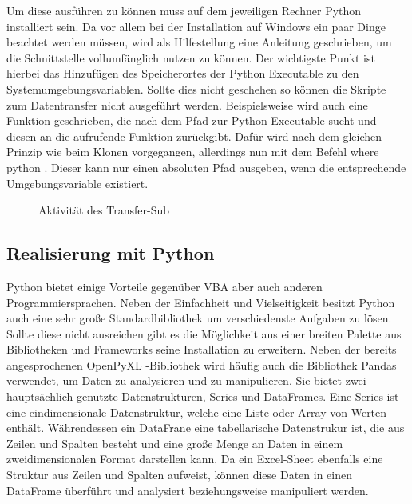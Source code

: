 \documentclass[11pt,a4paper]{report}
\begin{document}
\begin{enumerate}
    \noindent
    Um diese ausführen zu können muss auf dem jeweiligen Rechner Python installiert sein. Da vor allem bei der Installation auf Windows ein paar Dinge beachtet werden müssen, wird als Hilfestellung eine Anleitung geschrieben, um die Schnittstelle vollumfänglich nutzen zu können. Der wichtigste Punkt ist hierbei das Hinzufügen des Speicherortes der Python Executable zu den Systemumgebungsvariablen. Sollte dies nicht geschehen so können die Skripte zum Datentransfer nicht ausgeführt werden. Beispielsweise wird auch eine Funktion geschrieben, die nach dem Pfad zur Python-Executable sucht und diesen an die aufrufende Funktion zurückgibt. Dafür wird nach dem gleichen Prinzip wie beim Klonen vorgegangen, allerdings nun mit dem Befehl \glqq where python \grqq{}. Dieser kann nur einen absoluten Pfad ausgeben, wenn die entsprechende Umgebungsvariable existiert.
  \end{enumerate}

\begin{figure}[H]
    \centerline{}
    \caption{Aktivität des Transfer-Sub}
    \label{fig:activity_transfer}
\end{figure}



\subsection{Realisierung mit Python}

Python bietet einige Vorteile gegenüber VBA aber auch anderen Programmiersprachen. Neben der Einfachheit und Vielseitigkeit besitzt Python auch eine sehr große Standardbibliothek um verschiedenste Aufgaben zu lösen. Sollte diese nicht ausreichen gibt es die Möglichkeit aus einer breiten Palette aus Bibliotheken und Frameworks seine Installation zu erweitern. Neben der bereits angesprochenen \glqq OpenPyXL \grqq{}-Bibliothek wird häufig auch die Bibliothek \glqq Pandas \grqq{} verwendet, um Daten zu analysieren und zu manipulieren. Sie bietet zwei hauptsächlich genutzte Datenstrukturen, Series und DataFrames. Eine Series ist eine eindimensionale Datenstruktur, welche eine Liste oder Array von Werten enthält. Währendessen ein DataFrane eine tabellarische Datenstrukur ist, die aus Zeilen und Spalten besteht und eine große Menge an Daten in einem zweidimensionalen Format darstellen kann. Da ein Excel-Sheet ebenfalls eine Struktur aus Zeilen und Spalten aufweist, können diese Daten in einen DataFrame überführt und analysiert beziehungsweise manipuliert werden.
\end{document}
